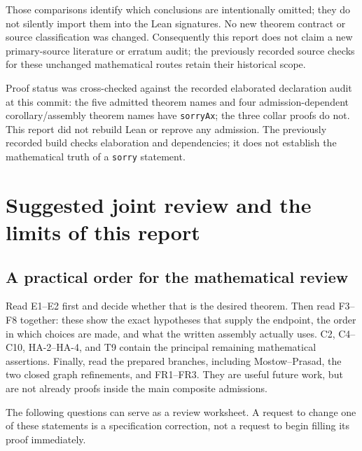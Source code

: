 \documentclass[
  letterpaper,
  11pt]{article}
\begin{document}
Those comparisons identify which conclusions are intentionally omitted;
they do not silently import them into the Lean signatures. No new
theorem contract or source classification was changed. Consequently this
report does not claim a new primary-source literature or erratum audit;
the previously recorded source checks for these unchanged mathematical
routes retain their historical scope.

Proof status was cross-checked against the recorded elaborated
declaration audit at this commit: the five admitted theorem names and
four admission-dependent corollary/assembly theorem names have
{\small\texttt{sorry\allowbreak{}Ax}}; the three collar proofs do not.
This report did not rebuild Lean or reprove any admission. The
previously recorded build checks elaboration and dependencies; it does
not establish the mathematical truth of a {\small\texttt{sorry}}
statement.

\section{Suggested joint review and the limits of this
report}\label{joint-review}

\subsection{A practical order for the mathematical
review}\label{review-order}

Read E1--E2 first and decide whether that is the desired theorem. Then
read F3--F8 together: these show the exact hypotheses that supply the
endpoint, the order in which choices are made, and what the written
assembly actually uses. C2, C4--C10, HA-2--HA-4, and T9 contain the
principal remaining mathematical assertions. Finally, read the prepared
branches, including Mostow--Prasad, the two closed graph refinements,
and FR1--FR3. They are useful future work, but are not already proofs
inside the main composite admissions.

The following questions can serve as a review worksheet. A request to
change one of these statements is a specification correction, not a
request to begin filling its proof immediately.
\end{document}
